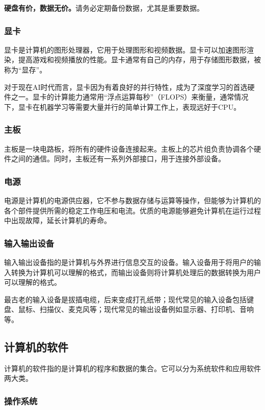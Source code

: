 \documentclass[../main.tex]{subfiles}
\begin{document}
\textbf{硬盘有价，数据无价。}请务必定期备份数据，尤其是重要数据。

\subsubsection{显卡}

显卡是计算机的图形处理器，它用于处理图形和视频数据。显卡可以加速图形渲染，提高游戏和视频播放的性能。显卡通常有自己的内存，用于存储图形数据，被称为“显存”。

对于现在AI时代而言，显卡因为有着良好的并行特性，成为了深度学习的首选硬件之一。显卡的计算能力通常用“浮点运算每秒”（FLOPS）来衡量，通常情况下，显卡在机器学习等需要大量并行的简单计算工作上，表现远好于CPU。

\subsubsection{主板}

主板是一块电路板，将所有的硬件设备连接起来。主板上的芯片组负责协调各个硬件之间的通信。同时，主板还有一系列外部接口，用于连接外部设备。

\subsubsection{电源}

电源是计算机的电源供应器，它不参与数据存储与运算等操作，但能够为计算机的各个部件提供所需的稳定工作电压和电流。优质的电源能够避免计算机在运行过程中出现故障，延长计算机的寿命。

\subsubsection{输入输出设备}

输入输出设备指的是计算机与外界进行信息交互的设备。输入设备用于将用户的输入转换为计算机可以理解的格式，而输出设备则将计算机处理后的数据转换为用户可以理解的格式。

最古老的输入设备是拔插电缆，后来变成打孔纸带；现代常见的输入设备包括键盘、鼠标、扫描仪、麦克风等；现代常见的输出设备例如显示器、打印机、音响等。

\subsection{计算机的软件}

计算机的软件指的是计算机的程序和数据的集合。它可以分为系统软件和应用软件两大类。

\subsubsection{操作系统}
\end{document}
